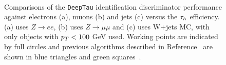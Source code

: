 \begin{figure}[p!]
\centering
     \\
\caption[Plots of \texttt{DeepTau} identification performance.]{Comparisons of the \texttt{DeepTau} identification discriminator performance against electrons (a), muons (b) and jets (c) versus the $\tau_{h}$ efficiency. (a) uses $Z\rightarrow ee$, (b) uses $Z\rightarrow \mu\mu$ and (c) uses W+jets MC, with only objects with $p_{T}<100$ GeV used. Working points are indicated by full circles and previous algorithms described in Reference~\cite{CMS:2018jrd} are shown in blue triangles and green squares~\cite{CMS:2022prd}.}
\label{fig:deeptau_misid}
\end{figure}
